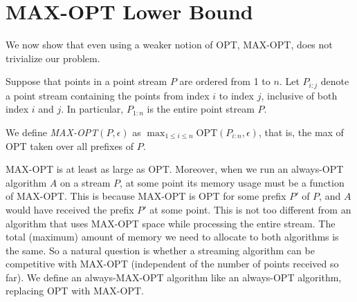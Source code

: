 

\section{MAX-OPT Lower Bound}

We now show that even using a weaker notion of OPT, MAX-OPT, does not trivialize our problem.

\begin{definition}
Suppose that points in a point stream $P$ are ordered from 1 to $n$. Let $P_{i:j}$ denote a point stream containing the points from index $i$ to index $j$, inclusive of both index $i$ and $j$. In particular, $P_{1:n}$ is the entire point stream $P$.
\end{definition}

\begin{definition}
We define \emph{MAX-OPT$(P, \epsilon)$} as $\max_{1 \leq i \leq n} \mbox{OPT}(P_{i:n}, \epsilon)$, that is, the max of OPT taken over all prefixes of $P$.
\end{definition}

MAX-OPT is at least as large as OPT. Moreover, when we run an always-OPT algorithm $A$ on a stream $P$, at some point its memory usage must be a function of MAX-OPT. This is because MAX-OPT is OPT for some prefix $P'$ of $P$, and $A$ would have received the prefix $P'$ at some point. This is not too different from an algorithm that uses MAX-OPT space while processing the entire stream. The total (maximum) amount of memory we need to allocate to both algorithms is the same. So a natural question is whether a streaming algorithm can be competitive with MAX-OPT (independent of the number of points received so far). We define an always-MAX-OPT algorithm like an always-OPT algorithm, replacing OPT with MAX-OPT.

